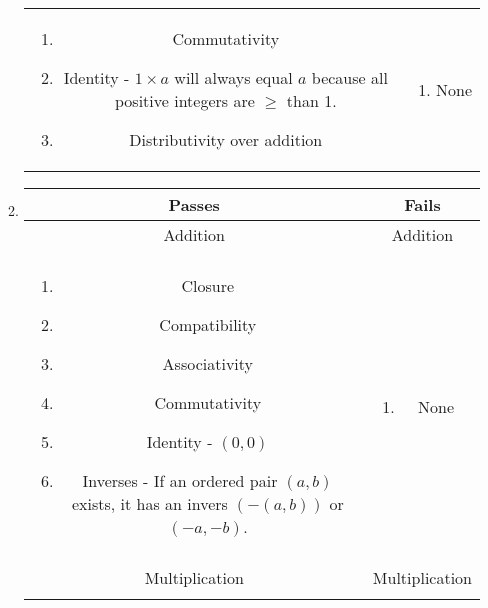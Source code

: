 \documentclass{article}
\begin{document}
\begin{enumerate}[label=\textbf{\arabic*}.]
\begin{enumerate}[label=\textbf{\alph*}.]
\begin{tabular}{c|c}
\begin{minipage}{0.425\textwidth}
\begin{enumerate}[label=-, itemsep=-3pt]
                \item Commutativity
                \item Identity - $1 \times a$ will always equal $a$ because all positive integers are $\geq$ than 1.
                \item Distributivity over addition
            \end{enumerate}
        \end{minipage}
        &
        \begin{minipage}{0.425\textwidth}
            \begin{enumerate}[label=-, itemsep=-3pt]
                \item None
            \end{enumerate}
        \end{minipage}
        \end{tabular}
        \item
        \begin{tabular}{c|c}
        \textcolor{pastelGreen}{Passes} & \textcolor{pastelRed}{Fails} \\
        \hline 
        Addition & Addition \\\\
        \begin{minipage}{0.425\textwidth}
            \begin{enumerate}[label=-, itemsep=-3pt]
                \item Closure
                \item Compatibility
                \item Associativity
                \item Commutativity
                \item Identity - $(0,0)$
                \item Inverses - If an ordered pair $(a,b)$ exists, it has an invers $(-(a,b))$ or $(-a,-b)$.
            \end{enumerate}
        \end{minipage}
        &
        \begin{minipage}{0.425\textwidth}
            \begin{enumerate}[label=-, itemsep=-3pt]
                \item None
            \end{enumerate}
        \end{minipage} \\\\
        Multiplication & Multiplication \\\\

\end{tabular}
\end{enumerate}
\end{enumerate}
\end{document}
